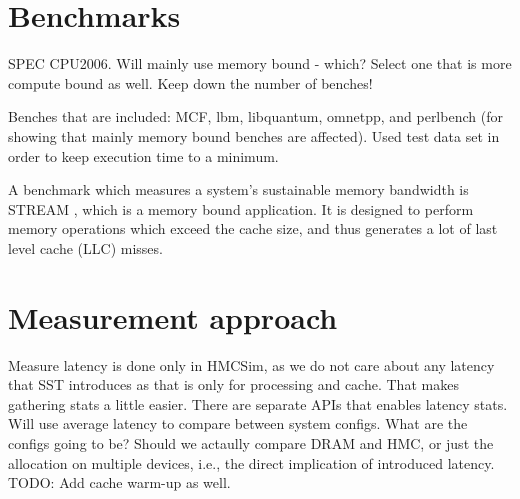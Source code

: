 
\section{Benchmarks}
SPEC CPU2006. Will mainly use memory bound - which? Select one that is more compute bound as well. Keep down the number of benches!
\bigskip

Benches that are included:
MCF, lbm, libquantum, omnetpp, and perlbench (for showing that mainly memory bound benches are affected). Used test data set in order to keep execution time to a minimum.

A benchmark which measures a system's sustainable memory bandwidth is STREAM \cite{mccalpin1995memory}, which is a memory bound application. It is designed to perform memory operations which exceed the cache size, and thus generates a lot of last level cache (LLC) misses.


\section{Measurement approach}
Measure latency is done only in HMCSim, as we do not care about any latency that SST introduces as that is only for processing and cache. That makes gathering stats a little easier. There are separate APIs that enables latency stats. Will use average latency to compare between system configs. What are the configs going to be? Should we actaully compare DRAM and HMC, or just the allocation on multiple devices, i.e., the direct implication of introduced latency. TODO: Add cache warm-up as well.